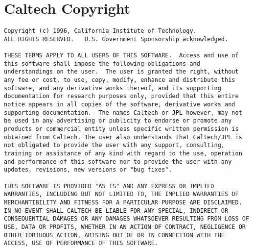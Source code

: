 \documentclass{article}
\begin{document}
\section{Caltech Copyright}
\label{HDF-copyright}
\begin{verbatim}
Copyright (c) 1996, California Institute of Technology.  
ALL RIGHTS RESERVED.   U.S. Government Sponsorship acknowledged. 

THESE TERMS APPLY TO ALL USERS OF THIS SOFTWARE.  Access and use of
this software shall impose the following obligations and
understandings on the user.  The user is granted the right, without
any fee or cost, to use, copy, modify, enhance and distribute this
software, and any derivative works thereof, and its supporting
documentation for research purposes only, provided that this entire
notice appears in all copies of the software, derivative works and
supporting documentation.  The names Caltech or JPL however, may not 
be used in any advertising or publicity to endorse or promote any
products or commercial entity unless specific written permission is
obtained from Caltech. The user also understands that Caltech/JPL is
not obligated to provide the user with any support, consulting,
training or assistance of any kind with regard to the use, operation
and performance of this software nor to provide the user with any
updates, revisions, new versions or "bug fixes".

THIS SOFTWARE IS PROVIDED "AS IS" AND ANY EXPRESS OR IMPLIED
WARRANTIES, INCLUDING BUT NOT LIMITED TO, THE IMPLIED WARRANTIES OF
MERCHANTIBILITY AND FITNESS FOR A PARTICULAR PURPOSE ARE DISCLAIMED.
IN NO EVENT SHALL CALTECH BE LIABLE FOR ANY SPECIAL, INDIRECT OR
CONSEQUENTIAL DAMAGES OR ANY DAMAGES WHATSOEVER RESULTING FROM LOSS OF
USE, DATA OR PROFITS, WHETHER IN AN ACTION OF CONTRACT, NEGLIGENCE OR
OTHER TORTUOUS ACTION, ARISING OUT OF OR IN CONNECTION WITH THE
ACCESS, USE OF PERFORMANCE OF THIS SOFTWARE.
\end{verbatim}
\end{document}

